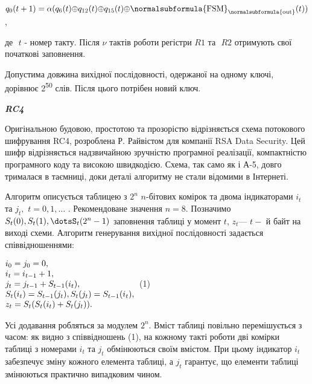 {\centering
 ${q_{{0}}(t+1)=\alpha
(q_{{6}}(t){\oplus}q_{{\text{12}}}(t){\oplus}q_{{\text{15}}}(t){\oplus}\normalsubformula{\text{FSM}}_{{\normalsubformula{\text{out}}}}(t))}$,
\par}

де  $ $  ${t}$ - номер такту. Після  ${\nu }$ тактів роботи регістри 
${\mathit{R1}}$ та $ $ ${\mathit{R2}}$ отримують свої початкові заповнення.

Допустима довжина вихідної послідовності, одержаної на одному ключі, дорівнює
2\textsuperscript{50 } слів. Після цього потрібен новий ключ.


\bigskip

{\centering\bfseries\itshape
RC4
\par}


\bigskip

Оригінальною будовою, простотою та прозорістю відрізняється схема потокового
шифрування RC4, розроблена Р. Райвістом для компанії RSA Data Security. Цей
шифр відрізняється надзвичайною зручністю програмної реалізації, компактністю
програмного коду та високою швидкодією. Схема, так само як і А-5, довго
трималася в таємниці, доки деталі алгоритму не стали відомими в Інтернеті. 

Алгоритм описується  таблицею з  ${2^{{n}}}$   ${n}${}-бітових комірок та двома
індикаторами  ${i_{{t}}}$ та  ${j_{{t}},}$  ${t=0,1,\dots}$
. Рекомендоване значення  ${n=8\text{.}}$ Позначимо  
${S_{{t}}(0),S_{{t}}(1),\dotsS_{{t}}(2^{{n}}-1)}$ заповнення
таблиці у момент  ${t}$,  ${z_{{t}}}$---  ${t-}$ й байт на виході схеми. 
Алгоритм генерування вихідної послідовності задається співвідношеннями:


\bigskip

{\centering
  $\begin{matrix}{i_{{0}}=j_{{0}}=0,}\hfill\null
\\i_{{t}}=i_{{t-1}}+1,\hfill\null
\\j_{{t}}=j_{{t-1}}+S_{{t-1}}(i_{{t}}),\hfill\null
\\S_{{t}}(i_{{t}})=S_{{t-1}}(j_{{t}}),S_{{t}}(j_{{t}})=S_{{t-1}}(i_{{t}}),\hfill\null
\\z_{{t}}=S_{{t}}(S_{{t}}(i_{{t}})+S_{{t}}(j_{{t}}))\text{.}\hfill\null
\end{matrix}\hfill $  (1)
\par}


\bigskip

Усі додавання робляться за модулем  ${2^{{n}}}$. Вміст таблиці повільно
перемішується з часом: як видно з співвідношень (1), на кожному такті роботи
дві комірки таблиці з номерами  ${i_{{t}}}$ та  ${j_{{t}}}$ обмінюються своїм
вмістом. При цьому індикатор  ${i_{{t}}}$ забезпечує зміну кожного елемента
таблиці, а  ${j_{{t}}}$ гарантує, що елементи таблиці змінюються практично
випадковим чином.

